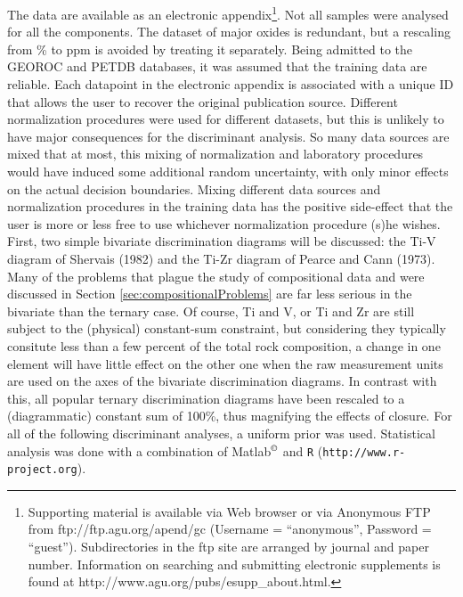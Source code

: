 \documentclass{article}
\begin{document}
The data  are available as  an electronic appendix\footnote{Supporting
material  is available  via  Web  browser or  via  Anonymous FTP  from
ftp://ftp.agu.org/apend/gc  (Username   =  ``anonymous'',  Password  =
``guest'').  Subdirectories  in the ftp  site are arranged  by journal
and paper number.  Information  on searching and submitting electronic
supplements is found at http://www.agu.org/pubs/esupp\_about.html.  }.
Not all samples were analysed  for all the components.  The dataset of
major oxides is  redundant, but a rescaling from \%  to ppm is avoided
by  treating it  separately. Being  admitted to  the GEOROC  and PETDB
databases, it was  assumed that the training data  are reliable.  Each
datapoint in  the electronic appendix  is associated with a  unique ID
that  allows the  user  to recover  the  original publication  source.
Different normalization  procedures were used  for different datasets,
but this is  unlikely to have major consequences  for the discriminant
analysis.  So many data sources are mixed that at most, this mixing of
normalization  and  laboratory  procedures  would  have  induced  some
additional random  uncertainty, with only minor effects  on the actual
decision boundaries.  Mixing  different data sources and normalization
procedures in the training data  has the positive side-effect that the
user is  more or  less free to  use whichever  normalization procedure
(s)he wishes.\\

First, two simple bivariate discrimination diagrams will be discussed:
the Ti-V  diagram of Shervais (1982)  and the Ti-Zr  diagram of Pearce
and  Cann (1973).   Many  of the  problems  that plague  the study  of
compositional     data    and     were     discussed    in     Section
\ref{sec:compositionalProblems} are far  less serious in the bivariate
than the  ternary case. Of course,  Ti and V,  or Ti and Zr  are still
subject  to the  (physical) constant-sum  constraint,  but considering
they typically  consitute less  than a few  percent of the  total rock
composition, a  change in one element  will have little  effect on the
other one when  the raw measurement units are used on  the axes of the
bivariate discrimination diagrams.  In contrast with this, all popular
ternary discrimination diagrams have been rescaled to a (diagrammatic)
constant sum  of 100\%, thus  magnifying the effects of  closure.  For
all of the following discriminant  analyses, a uniform prior was used.
Statistical    analysis    was   done    with    a   combination    of
Matlab$^{\copyright}$                  and                  \texttt{R}
(\texttt{http://www.r-project.org}).\\
\end{document}
